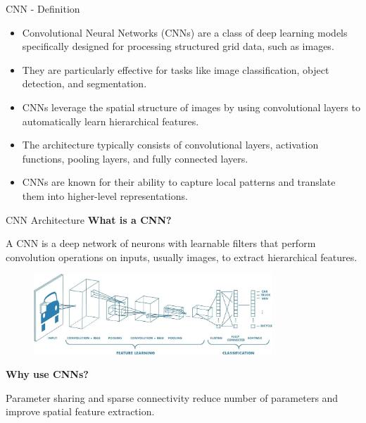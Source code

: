 \begin{frame}[allowframebreaks]{CNN - Definition}
\begin{itemize}
    \item Convolutional Neural Networks (CNNs) are a class of deep learning models specifically designed for processing structured grid data, such as images.
    \item They are particularly effective for tasks like image classification, object detection, and segmentation.
    \item CNNs leverage the spatial structure of images by using convolutional layers to automatically learn hierarchical features.
    \item The architecture typically consists of convolutional layers, activation functions, pooling layers, and fully connected layers.
    \item CNNs are known for their ability to capture local patterns and translate them into higher-level representations.
\end{itemize}
\end{frame}  

\begin{frame}{CNN Architecture}
    \textbf{What is a CNN?}
    
     A CNN is a deep network of neurons with learnable filters that perform convolution operations on inputs, usually images, to extract hierarchical features.
    
    \begin{figure}
    \centering
    \includegraphics[width=0.8\textwidth,height=0.4\textheight,keepaspectratio]{images/cnn-architecture.png}
    \end{figure}
    \newline
    \left

    \textbf{Why use CNNs?}
    
    Parameter sharing and sparse connectivity reduce number of parameters and improve spatial feature extraction.
\end{frame}

